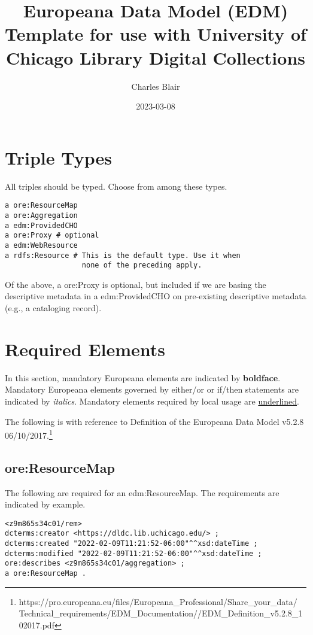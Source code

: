 \documentclass[11pt]{article}
\date{2023-03-08}
\title{Europeana Data Model (EDM) Template for use with University of Chicago Library Digital Collections}
\author{Charles Blair}
\begin{document}
\maketitle

\section{Triple Types}
All triples should be typed. Choose from among these types.

\begin{lstlisting}
a ore:ResourceMap
a ore:Aggregation
a edm:ProvidedCHO
a ore:Proxy # optional
a edm:WebResource
a rdfs:Resource # This is the default type. Use it when
                  none of the preceding apply.
\end{lstlisting}

Of the above, a ore:Proxy is optional, but included if we are basing the descriptive metadata in a edm:ProvidedCHO on pre-existing descriptive metadata (e.g., a cataloging record).

\section{Required Elements}
In this section, mandatory Europeana elements are indicated by \textbf{boldface}. Mandatory Europeana elements governed by either/or or if/then statements are indicated by \textit{italics}. Mandatory elements required by local usage are \underline{underlined}.

The following is with reference to Definition of the Europeana Data Model v5.2.8 06/10/2017.\footnote{https://pro.europeana.eu/files/Europeana\_Professional/Share\_your\_data/
Technical\_requirements/EDM\_Documentation//EDM\_Definition\_v5.2.8\_102017.pdf}

\subsection{ore:ResourceMap}

The following are required for an edm:ResourceMap. The requirements are indicated by example.

\begin{verbatim}
<z9m865s34c01/rem>
dcterms:creator <https://dldc.lib.uchicago.edu/> ;
dcterms:created "2022-02-09T11:21:52-06:00"^^xsd:dateTime ;
dcterms:modified "2022-02-09T11:21:52-06:00"^^xsd:dateTime ;
ore:describes <z9m865s34c01/aggregation> ;
a ore:ResourceMap .
\end{verbatim}
\end{document}
